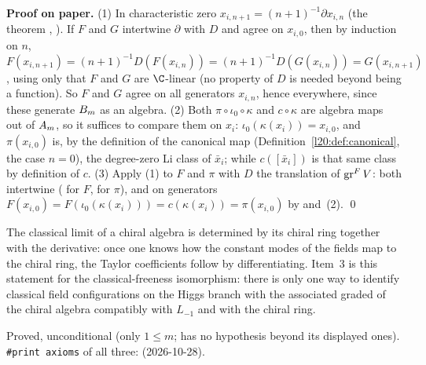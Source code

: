 \textbf{Proof on paper.} (1) In characteristic zero $x_{i,n+1}=(n+1)^{-1}\partial x_{i,n}$ (the theorem ,
). If $F$ and $G$ intertwine $\partial$ with
$D$ and agree on $x_{i,0}$, then by induction on $n$,
$F(x_{i,n+1})=(n+1)^{-1}D(F(x_{i,n}))=(n+1)^{-1}D(G(x_{i,n}))=G(x_{i,n+1})$, using only that $F$ and $G$ are $\C$-linear
(no property of $D$ is needed beyond being a function). So $F$
and $G$ agree on all generators $x_{i,n}$, hence everywhere, since these generate $B_m$ as an algebra. (2) Both
$\pi\circ\iota_0\circ\kappa$ and $c\circ\kappa$ are algebra maps out of $A_m$, so it suffices to compare them on $x_i$:
$\iota_0(\kappa(x_i))=x_{i,0}$, and $\pi(x_{i,0})$ is, by the definition of the canonical map
(Definition~\ref{l20:def:canonical}, the case $n=0$), the degree-zero Li class of $\bar x_i$; while $c([\bar x_i])$ is that
same class by definition of $c$. (3) Apply (1) to $F$ and $\pi$ with $D$ the translation of $\operatorname{gr}^F V$: both intertwine
( for $F$,  for $\pi$), and on generators
$F(x_{i,0})=F(\iota_0(\kappa(x_i)))=c(\kappa(x_i))=\pi(x_{i,0})$ by  and~(2). \qed

\begin{physics}
The classical limit of a chiral algebra is determined by its chiral ring together with the derivative: once one knows how the
constant modes of the fields map to the chiral ring, the Taylor coefficients follow by differentiating. Item~3 is this
statement for the classical-freeness isomorphism: there is only one way to identify classical field configurations on the Higgs
branch with the associated graded of the chiral algebra compatibly with $L_{-1}$ and with the chiral ring.
\end{physics}

\begin{status}
Proved, unconditional (only $1\le m$;  has no hypothesis beyond its displayed ones).
\texttt{\#print axioms} of all three:  (2026-10-28).
\end{status}

